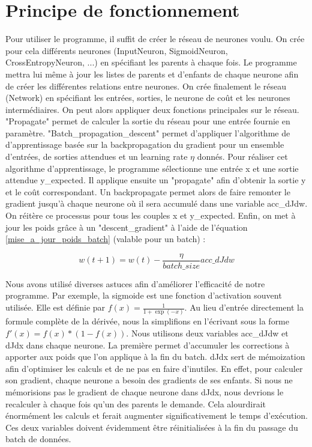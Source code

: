 \documentclass{report}
\theoremstyle{plain}
\theoremstyle{definition}
\theoremstyle{remark}
\begin{document}
\section{Principe de fonctionnement}
Pour utiliser le programme, il suffit de créer le réseau de neurones voulu. On crée pour cela différents neurones (InputNeuron, SigmoidNeuron, CrossEntropyNeuron, ...) en spécifiant les parents à chaque fois. Le programme mettra lui même à jour les listes de parents et d'enfants de chaque neurone afin de créer les différentes relations entre neurones. On crée finalement le réseau (Network) en spécifiant les entrées, sorties, le neurone de coût et les neurones intermédiaires.
On peut alors appliquer deux fonctions principales sur le réseau. "Propagate" permet de calculer la sortie du réseau pour une entrée fournie en paramètre. "Batch\_propagation\_descent" permet d'appliquer l'algorithme de d'apprentissage basée sur la backpropagation du gradient pour un ensemble d'entrées, de sorties attendues et un learning rate $\eta$ donnés. 
Pour réaliser cet algorithme d'apprentissage, le programme sélectionne une entrée x et une sortie attendue y\_expected. Il applique ensuite un "propagate" afin d'obtenir la sortie y et le coût correspondant. Un backpropagate permet alors de faire remonter le gradient jusqu'à chaque neurone où il sera accumulé dans une variable acc\_dJdw. On réitère ce processus pour tous les couples x et y\_expected. Enfin, on met à jour les poids grâce à un "descent\_gradient" à l'aide de l'équation \ref{mise_a_jour_poids_batch} (valable pour un batch) :

\begin{equation}
w(t+1) = w(t) - \frac{\eta}{batch\_size}acc\_dJdw
\label{mise_a_jour_poids_batch}
\end{equation}

Nous avons utilisé diverses astuces afin d'améliorer l'efficacité de notre programme. Par exemple, la sigmoide est une fonction d'activation souvent utilisée. Elle est définie par $f(x) = \frac{1}{1+\exp(-x)}$. Au lieu d'entrée directement la formule complète de la dérivée, nous la simplifions en l'écrivant sous la forme $f'(x) = f(x) * (1 - f(x))$.
Nous utilisons deux variables acc\_dJdw et dJdx dans chaque neurone. La première permet d'accumuler les corrections à apporter aux poids que l'on applique à la fin du batch. dJdx sert de mémoization afin d'optimiser les calculs et de ne pas en faire d'inutiles. En effet, pour calculer son gradient, chaque neurone a besoin des gradients de ses enfants. Si nous ne mémorisions pas le gradient de chaque neurone dans dJdx, nous devrions le recalculer à chaque fois qu'un des parents le demande. Cela alourdirait énormément les calculs et ferait augmenter significativement le temps d'exécution. Ces deux variables doivent évidemment être réinitialisées à la fin du passage du batch de données.
\end{document}
